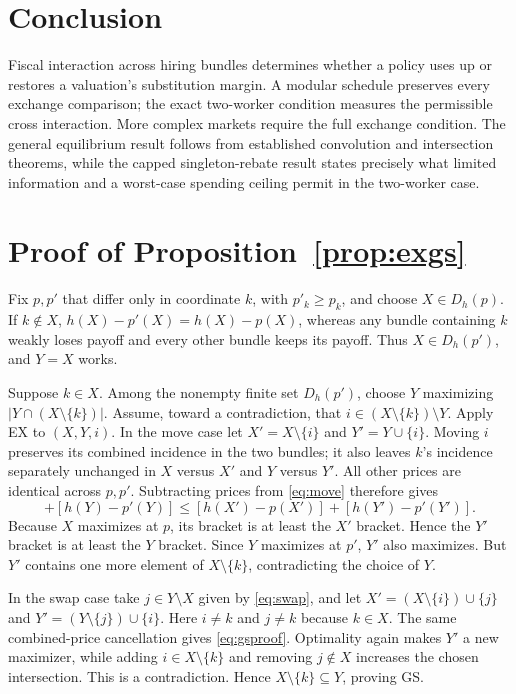 \documentclass[11pt]{article}
\theoremstyle{definition}
\theoremstyle{remark}
\numberwithin{equation}{section}
\begin{document}
\section{Conclusion}
Fiscal interaction across hiring bundles determines whether a policy uses up or restores a valuation's substitution margin. A modular schedule preserves every exchange comparison; the exact two-worker condition measures the permissible cross interaction. More complex markets require the full exchange condition. The general equilibrium result follows from established convolution and intersection theorems, while the capped singleton-rebate result states precisely what limited information and a worst-case spending ceiling permit in the two-worker case.

\appendix
\section{Proof of Proposition~\ref{prop:exgs}}\label{app:exgs}

Fix $p,p'$ that differ only in coordinate $k$, with $p'_k\ge p_k$, and choose $X\in D_h(p)$. If $k\notin X$, $h(X)-p'(X)=h(X)-p(X)$, whereas any bundle containing $k$ weakly loses payoff and every other bundle keeps its payoff. Thus $X\in D_h(p')$, and $Y=X$ works.

Suppose $k\in X$. Among the nonempty finite set $D_h(p')$, choose $Y$ maximizing $|Y\cap(X\setminus\{k\})|$. Assume, toward a contradiction, that $i\in(X\setminus\{k\})\setminus Y$. Apply EX to $(X,Y,i)$. In the move case let $X'=X\setminus\{i\}$ and $Y'=Y\cup\{i\}$. Moving $i$ preserves its combined incidence in the two bundles; it also leaves $k$'s incidence separately unchanged in $X$ versus $X'$ and $Y$ versus $Y'$. All other prices are identical across $p,p'$. Subtracting prices from \eqref{eq:move} therefore gives
\begin{equation}
[h(X)-p(X)]+[h(Y)-p'(Y)]
\le [h(X')-p(X')]+[h(Y')-p'(Y')].             \label{eq:gsproof}
\end{equation}
Because $X$ maximizes at $p$, its bracket is at least the $X'$ bracket. Hence the $Y'$ bracket is at least the $Y$ bracket. Since $Y$ maximizes at $p'$, $Y'$ also maximizes. But $Y'$ contains one more element of $X\setminus\{k\}$, contradicting the choice of $Y$.

In the swap case take $j\in Y\setminus X$ given by \eqref{eq:swap}, and let $X'=(X\setminus\{i\})\cup\{j\}$ and $Y'=(Y\setminus\{j\})\cup\{i\}$. Here $i\ne k$ and $j\ne k$ because $k\in X$. The same combined-price cancellation gives \eqref{eq:gsproof}. Optimality again makes $Y'$ a new maximizer, while adding $i\in X\setminus\{k\}$ and removing $j\notin X$ increases the chosen intersection. This is a contradiction. Hence $X\setminus\{k\}\subseteq Y$, proving GS.
\end{document}

